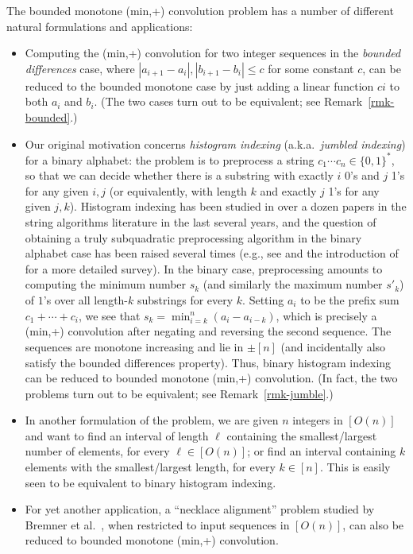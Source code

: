 \documentclass[11pt]{article}
\newcommand{\LONG}[1]{#1}\newcommand{\SHORT}[1]{}
\begin{document}
The bounded monotone (min,+) convolution problem has a number
of different natural formulations and applications:
\begin{itemize}
\item
Computing the (min,+) convolution  for two integer sequences in
the \emph{bounded differences} case, where
$|a_{i+1}-a_i|,|b_{i+1}-b_i|\le c$ for some constant $c$,
can be reduced to the bounded monotone case by
just adding a linear function $ci$ to both $a_i$ and $b_i$.
(The two cases turn out to be equivalent\LONG{; see Remark~\ref{rmk-bounded}}.)
\item
Our original motivation concerns {\em histogram indexing}
(a.k.a.\ {\em jumbled indexing}) for a binary alphabet: the problem
is to preprocess a string $c_1\cdots c_n\in\{0,1\}^*$, so that we can decide whether there is a substring with exactly $i$ 0's and $j$ 1's for any given $i,j$ (or equivalently,
with length $k$ and exactly $j$ 1's for any given $j,k$).
Histogram indexing has been studied in over a dozen papers in the string algorithms literature in the last several years, and
the question of obtaining a truly subquadratic preprocessing
algorithm in the binary alphabet case has been raised several times
(e.g., see \cite{BCFL10,MR10,MR12} and the introduction of~\cite{ACLL14} for a more detailed survey).
In the binary case,
preprocessing amounts to computing the minimum number $s_k$
(and similarly the maximum number $s'_k$) of $1$'s
over all length-$k$ substrings for every $k$.
Setting $a_i$ to be the prefix sum $c_1+\cdots + c_i$, we see
that $s_k=\min_{i=k}^n (a_i-a_{i-k})$, which is precisely
a (min,+) convolution after negating and reversing the second
sequence.  The sequences are monotone increasing and lie in $\pm [n]$
(and incidentally also satisfy the bounded differences property).
Thus, binary histogram indexing can be reduced to bounded monotone
(min,+) convolution.
(In fact, the two problems turn out to be equivalent\LONG{; see Remark~\ref{rmk-jumble}}.)
\item
In another formulation of the problem, we are
given $n$ integers in $[O(n)]$ and want to find an interval
of length $\ell$ containing the smallest/largest number of elements,
for every $\ell\in [O(n)]$; or find an interval containing
$k$ elements with the smallest/largest length, for every $k\in [n]$.
This is easily seen to be equivalent to binary histogram indexing.
\item
For yet another application,
a ``necklace alignment'' problem
studied by Bremner et al.~\cite{BCDEHILPT14}, when restricted to input
sequences in $[O(n)]$, can also be reduced to bounded monotone (min,+) convolution.
\end{itemize}
\end{document}
